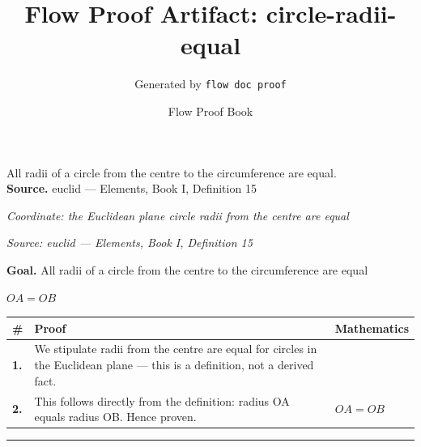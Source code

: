 \documentclass[11pt]{article}
\title{Flow Proof Artifact: circle-radii-equal}
\author{Generated by \texttt{flow doc proof}}
\date{Flow Proof Book}
\theoremstyle{definition}
\begin{document}
\maketitle
All radii of a circle from the centre to the circumference are equal.\\[0.5em]
\textbf{Source.} euclid — Elements, Book I, Definition 15\\[0.5em]
\bigskip
{}\par
\smallskip\noindent\textit{Coordinate: the Euclidean plane \cdot circle \cdot radii from the centre are equal}\par
\smallskip\noindent\textit{Source: euclid — Elements, Book I, Definition 15}\par
\medskip
\noindent\textbf{Goal.} All radii of a circle from the centre to the circumference are equal\par
\noindent$\displaystyle OA = OB$\par
\medskip
\noindent
\begin{tabular}{@{} >{\raggedright\arraybackslash}p{} >{\raggedright\arraybackslash}p{} >{\raggedleft\arraybackslash}p{} @{}}
\textbf{\#} & \textbf{Proof} & \textbf{Mathematics} \\
\midrule
\textbf{1.} & We stipulate radii from the centre are equal for circles in the Euclidean plane — this is a definition, not a derived fact. & \\[0.45em]
\textbf{2.} & This follows directly from the definition: radius OA equals radius OB. Hence proven. & $\displaystyle OA = OB$ \\[0.45em]
\bottomrule
\end{tabular}
\label{thm:Geometry-circle-radii_from_the_centre_are_equal}
\par\medskip\hrule
\end{document}
